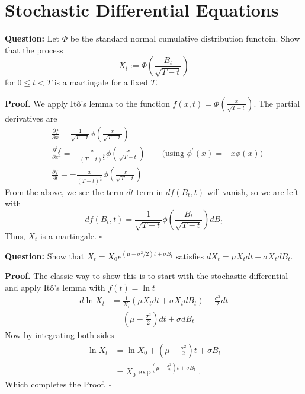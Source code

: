 \documentclass{article}
\begin{document}
\newpage
\section{Stochastic Differential Equations}

\begin{tcolorbox}[colframe=black,colback=gray!5,boxrule=0.5pt]
\textbf{Question:} Let $\Phi$ be the standard normal cumulative distribution functoin. Show that the process $$X_t := \Phi\left(\frac{B_t}{\sqrt{T-t}}\right)$$ for $0\leq t<T$ is a martingale for a fixed $T$.
\end{tcolorbox}
\textbf{Proof.} We apply Itô's lemma to the function $f(x,t) = \Phi(\frac{x}{\sqrt{T-t}})$. The partial derivatives are 
\begin{align*}
    & \frac{\partial f}{\partial x} = \frac{1}{\sqrt{T-t}} \phi\left(\frac{x}{\sqrt{T-t}}\right) \\
    & \frac{\partial^2 f}{\partial x^2} = - \frac{x}{(T-t)^{\frac{3}{2}}} \phi\left(\frac{x}{\sqrt{T-t}}\right) \quad\quad \text{(using $\phi^\prime(x) = -x\phi(x)$)} \\
    & \frac{\partial f}{\partial t} = -\frac{x}{(T-t)^{\frac{3}{2}}}\phi\left(\frac{x}{\sqrt{T-t}}\right)
\end{align*}
From the above, we see the term $dt$ term in $df(B_t,t)$ will vanish, so we are left with 
$$df(B_t,t) = \frac{1}{\sqrt{T-t}} \phi\left(\frac{B_t}{\sqrt{T-t}}\right)dB_t$$
Thus, $X_t$ is a martingale. $\square$




\begin{tcolorbox}[colframe=black,colback=gray!5,boxrule=0.5pt]
\textbf{Question:} Show that $X_t = X_0 e^{(\mu-\sigma^2/2)t + \sigma B_t}$ satisfies $dX_t =\mu X_t dt + \sigma X_t dB_t$.
\end{tcolorbox}
\textbf{Proof.} The classic way to show this is to start with the stochastic differential and apply Itô's lemma with $f(t) = \ln t$
\begin{align*}
    d\ln X_t  &= \frac{1}{X_t}(\mu X_t dt + \sigma X_t dB_t) - \frac{\sigma^2}{2}dt \\
              &= \left(\mu - \frac{\sigma^2}{2}\right)dt + \sigma dB_t
\end{align*}
Now by integrating both sides
\begin{align*}
    \ln X_t &= \ln X_0 + \left(\mu - \frac{\sigma^2}{2}\right)t + \sigma B_t \\
    &= X_0 \exp^{\left(\mu - \frac{\sigma^2}{2}\right)t + \sigma B_t}.
\end{align*}
Which completes the Proof. $\square$
\end{document}

